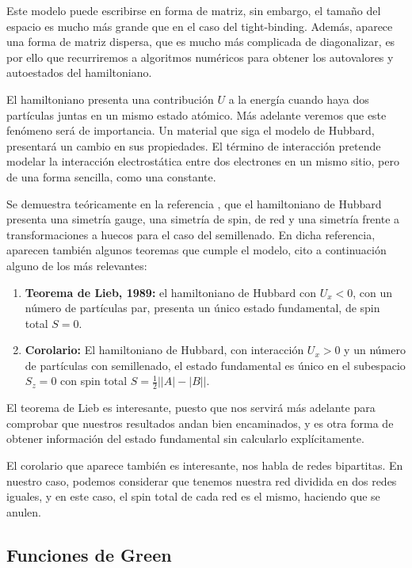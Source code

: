 \documentclass[12pt,twoside]{article}
\begin{document}
Este modelo puede escribirse en forma de matriz, sin embargo, el tamaño del espacio es mucho más grande que en el caso del tight-binding. Además, aparece una forma de matriz dispersa, que es mucho más complicada de diagonalizar, es por ello que recurriremos a algoritmos numéricos para obtener los autovalores y autoestados del hamiltoniano.

El hamiltoniano presenta una contribución $U$ a la energía cuando haya dos partículas juntas en un mismo estado atómico. Más adelante veremos que este fenómeno será de importancia. Un material que siga el modelo de Hubbard, presentará un cambio en sus propiedades. El término de interacción pretende modelar la interacción electrostática entre dos electrones en un mismo sitio, pero de una forma sencilla, como una constante.

Se demuestra teóricamente en la referencia \cite{MielkeHubbard}, que el hamiltoniano de Hubbard presenta una simetría gauge, una simetría de spin, de red y una simetría frente a transformaciones a huecos para el caso del semillenado. En dicha referencia, aparecen también algunos teoremas que cumple el modelo, cito a continuación alguno de los más relevantes:
\begin{enumerate}
  \item \textbf{Teorema de Lieb, 1989:} el hamiltoniano de Hubbard con $U_x < 0$, con un número de partículas par, presenta un único estado fundamental, de spin total $S = 0$.
  \item \textbf{Corolario:} El hamiltoniano de Hubbard, con interacción $U_x > 0$ y un número de partículas con semillenado, el estado fundamental es único en el subespacio $S_z = 0$ con spin total $S = \frac{1}{2}\left||A| - |B|\right|$.
\end{enumerate}

El teorema de Lieb es interesante, puesto que nos servirá más adelante para comprobar que nuestros resultados andan bien encaminados, y es otra forma de obtener información del estado fundamental sin calcularlo explícitamente.

El corolario que aparece también es interesante, nos habla de redes bipartitas. En nuestro caso, podemos considerar que tenemos nuestra red dividida en dos redes iguales, y en este caso, el spin total de cada red es el mismo, haciendo que se anulen.
\subsection{Funciones de Green}
\end{document}
